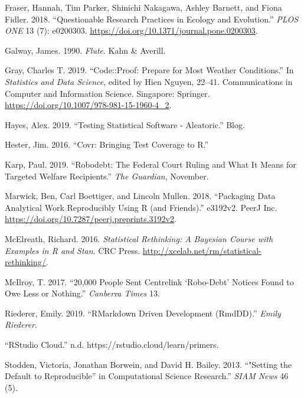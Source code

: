 \documentclass[
]{article}
\newlength{\cslhangindent}
\newenvironment{cslreferences}%
  {\setlength{\parindent}{0pt}%
  \everypar{\setlength{\hangindent}{\cslhangindent}}\ignorespaces}%
  {\par}
\begin{document}
\begin{cslreferences}
\leavevmode\hypertarget{ref-fraser_questionable_2018}{}%
Fraser, Hannah, Tim Parker, Shinichi Nakagawa, Ashley Barnett, and Fiona
Fidler. 2018. ``Questionable Research Practices in Ecology and
Evolution.'' \emph{PLOS ONE} 13 (7): e0200303.
\url{https://doi.org/10.1371/journal.pone.0200303}.

\leavevmode\hypertarget{ref-galway_flute_1990}{}%
Galway, James. 1990. \emph{Flute}. Kahn \& Averill.

\leavevmode\hypertarget{ref-grayCodeProofPrepare2019}{}%
Gray, Charles T. 2019. ``Code::Proof: Prepare for Most Weather
Conditions.'' In \emph{Statistics and Data Science}, edited by Hien
Nguyen, 22--41. Communications in Computer and Information Science.
Singapore: Springer. \url{https://doi.org/10.1007/978-981-15-1960-4_2}.

\leavevmode\hypertarget{ref-hayes_testing_2019}{}%
Hayes, Alex. 2019. ``Testing Statistical Software - Aleatoric.'' Blog.

\leavevmode\hypertarget{ref-hester_covr_2016}{}%
Hester, Jim. 2016. ``Covr: Bringing Test Coverage to R.''

\leavevmode\hypertarget{ref-karp_robodebtfederalcourt_2019}{}%
Karp, Paul. 2019. ``Robodebt: The Federal Court Ruling and What It Means
for Targeted Welfare Recipients.'' \emph{The Guardian}, November.

\leavevmode\hypertarget{ref-marwick_packaging_2018}{}%
Marwick, Ben, Carl Boettiger, and Lincoln Mullen. 2018. ``Packaging Data
Analytical Work Reproducibly Using R (and Friends).'' e3192v2. PeerJ
Inc. \url{https://doi.org/10.7287/peerj.preprints.3192v2}.

\leavevmode\hypertarget{ref-statrethinkingbook}{}%
McElreath, Richard. 2016. \emph{Statistical Rethinking: A Bayesian
Course with Examples in R and Stan}. CRC Press.
\url{http://xcelab.net/rm/statistical-rethinking/}.

\leavevmode\hypertarget{ref-mcilroy201720}{}%
McIlroy, T. 2017. ``20,000 People Sent Centrelink `Robo-Debt' Notices
Found to Owe Less or Nothing.'' \emph{Canberra Times} 13.

\leavevmode\hypertarget{ref-riederer_rmarkdowndrivendevelopment_2019}{}%
Riederer, Emily. 2019. ``RMarkdown Driven Development (RmdDD).''
\emph{Emily Riederer}.

\leavevmode\hypertarget{ref-_rstudiocloud_}{}%
``RStudio Cloud.'' n.d. https://rstudio.cloud/learn/primers.

\leavevmode\hypertarget{ref-stodden_setting_2013}{}%
Stodden, Victoria, Jonathan Borwein, and David H. Bailey. 2013.
``"Setting the Default to Reproducible'' in Computational Science
Research.'' \emph{SIAM News} 46 (5).


\end{cslreferences}
\end{document}
